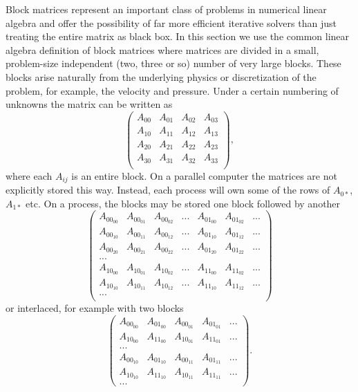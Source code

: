 Block matrices represent an important class of problems in numerical
linear algebra and offer the possibility of far more efficient
iterative solvers than just treating the entire matrix as black box. In
this section we use the common linear algebra definition of
block matrices where matrices are divided in a small, problem-size independent (two, three or
so) number of very large blocks. These blocks arise naturally from
the underlying physics or discretization of the problem, for example, the velocity and pressure. Under a
certain numbering of unknowns the matrix can be written as
\[
\left( \begin{array}{cccc}
A_{00}   & A_{01} & A_{02} & A_{03} \\
A_{10}   & A_{11} & A_{12} & A_{13} \\
A_{20}   & A_{21} & A_{22} & A_{23} \\
A_{30}   & A_{31} & A_{32} & A_{33} \\
\end{array} \right),
\]
where each $ A_{ij}$ is an entire block.
On a parallel computer the matrices are not explicitly stored this way.
Instead, each process will own some of the rows of $A_{0*}$, $A_{1*}$
etc. On a process, the blocks may be stored one block followed by another
\[
\left( \begin{array}{ccccccc}
A_{{00}_{00}}   & A_{{00}_{01}} & A_{{00}_{02}} & ... & A_{{01}_{00}} & A_{{01}_{02}} & ...  \\
A_{{00}_{10}}   & A_{{00}_{11}} & A_{{00}_{12}} & ... & A_{{01}_{10}} & A_{{01}_{12}} & ... \\
A_{{00}_{20}}   & A_{{00}_{21}} & A_{{00}_{22}} & ... & A_{{01}_{20}} & A_{{01}_{22}}  & ...\\
... \\
A_{{10}_{00}}   & A_{{10}_{01}} & A_{{10}_{02}} & ... & A_{{11}_{00}} & A_{{11}_{02}}  & ... \\
A_{{10}_{10}}   & A_{{10}_{11}} & A_{{10}_{12}} & ... & A_{{11}_{10}} & A_{{11}_{12}}  & ... \\
... \\
\end{array} \right)
\]
or interlaced, for example with two blocks
\[
\left( \begin{array}{ccccc}
A_{{00}_{00}}   & A_{{01}_{00}} &  A_{{00}_{01}} & A_{{01}_{01}} &  ... \\
A_{{10}_{00}}   & A_{{11}_{00}} &  A_{{10}_{01}} & A_{{11}_{01}} &  ... \\
... \\
A_{{00}_{10}}   & A_{{01}_{10}} & A_{{00}_{11}} & A_{{01}_{11}} & ...\\
A_{{10}_{10}}   & A_{{11}_{10}} & A_{{10}_{11}} & A_{{11}_{11}} & ...\\
...
\end{array} \right).
\]
